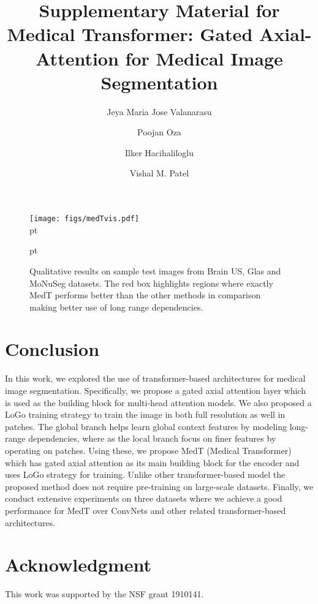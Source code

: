 \documentclass[runningheads]{llncs}
\begin{document}
\begin{figure}[!]
	\centering
	\texttt{[image: figs/medTvis.pdf]}\\
	 pt
	\caption{Qualitative results on sample test images from Brain US, Glas and MoNuSeg datasets. The red box highlights regions where exactly MedT performs better than the other methods in comparison making better use of long range dependencies.}
	
	\label{fig:res}
	 pt
\end{figure}


	




	\section{Conclusion}
	
	In this work, we explored the use of transformer-based architectures for medical image segmentation. Specifically, we propose a gated axial attention layer which is used as the building block for multi-head attention models. We also proposed a LoGo training strategy to train the image in both full resolution as well in patches. The global branch helps learn global context features by modeling long-range dependencies, where as the local branch focus on finer features by operating on patches. Using these, we propose MedT (Medical Transformer) which has gated axial attention as its main building block for the encoder and uses LoGo strategy for training. Unlike other transformer-based model the proposed method does not require pre-training on large-scale datasets. Finally, we conduct extensive experiments on three datasets where we achieve a good performance for MedT over ConvNets and other related transformer-based architectures.
	
	\section*{Acknowledgment}
	This work was supported by the NSF grant 1910141.
	
		
	
	\title{Supplementary Material for Medical Transformer: Gated Axial-Attention for Medical Image Segmentation}
\author{Jeya Maria Jose Valanarasu \and 
	Poojan Oza \and
	Ilker Hacihaliloglu \and
	Vishal M. Patel
}
\maketitle              
\end{document}
